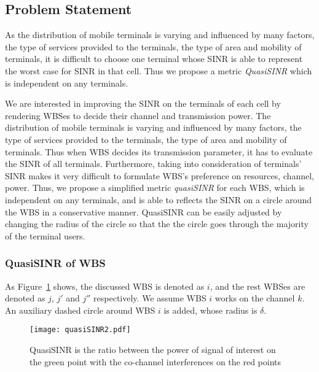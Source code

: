 \subsection{Problem Statement}

As the distribution of mobile terminals is varying and influenced by many factors, \ie the type of services provided to the terminals, the type of area and mobility of terminals, it is difficult to choose one terminal whose SINR is able to represent the worst case for SINR in that cell.
Thus we propose a metric \textit{QuasiSINR} which is independent on any terminals.

We are interested in improving the SINR on the terminals of each cell by rendering WBSes to decide their channel and transmission power.
The distribution of mobile terminals is varying and influenced by many factors, \ie the type of services provided to the terminals, the type of area and mobility of terminals.
Thus when WBS decides its transmission parameter, it has to evaluate the SINR of all terminals.
Furthermore, taking into consideration of terminals' SINR makes it very difficult to formulate WBS's preference on resources, \ie channel, power.
Thus, we propose a simplified metric \textit{quasiSINR} for each WBS, which is independent on any terminals, and is able to  reflects the SINR on a circle around the WBS in a conservative manner.
QuasiSINR can be easily adjusted by changing the radius of the circle so that the the circle goes through the majority of the terminal users.


\subsubsection*{QuasiSINR of WBS}



As Figure~\ref{quasiSINRfigure} shows, the discussed WBS is denoted as $i$, and the rest WBSes are denoted as $j$, $j'$ and $j''$ respectively.
We assume WBS $i$ works on the channel $k$.
An auxiliary dashed circle around WBS $i$ is added, whose radius is $\delta$. 


\begin{figure}[h!]
  \centering
  \texttt{[image: quasiSINR2.pdf]}
  \caption{QuasiSINR is the ratio between the power of signal of interest on the green point with the co-channel interferences on the red points}
\label{quasiSINRfigure}
\end{figure}



